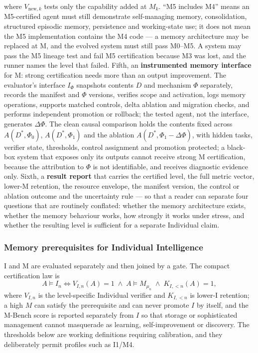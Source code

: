 where $V_{\mathrm{new},k}$ tests only the capability added at $M_k$. ``M5 includes M4'' means an M5-certified agent must still demonstrate self-managing memory, consolidation, structured episodic memory, persistence and working-state use; it does not mean the M5 implementation contains the M4 code --- a memory architecture may be replaced at M\Om{}, and the evolved system must still pass M0--M5. A system may pass the M5 lineage test and fail M5 certification because M3 was lost, and the runner names the level that failed. Fifth, an \textbf{instrumented memory interface} for M\Om{}: strong certification needs more than an output improvement. The evaluator's interface $I_\Phi$ snapshots contents $D$ and mechanism $\Phi$ separately, records the manifest and $\Phi$ versions, verifies scope and activation, logs memory operations, supports matched controls, delta ablation and migration checks, and performs independent promotion or rollback; the tested agent, not the interface, generates $\Delta\Phi$. The clean causal comparison holds the contents fixed across $A(D^{*},\Phi_0)$, $A(D^{*},\Phi_1)$ and the ablation $A(D^{*},\Phi_1 - \Delta\Phi)$, with hidden tasks, verifier state, thresholds, control assignment and promotion protected; a black-box system that exposes only its outputs cannot receive strong M\Om{} certification, because the attribution to $\Phi$ is not identifiable, and receives diagnostic evidence only. Sixth, a \textbf{result report} that carries the certified level, the full metric vector, lower-M retention, the resource envelope, the manifest version, the control or ablation outcome and the uncertainty rule --- so that a reader can separate four questions that are routinely conflated: whether the memory architecture exists, whether the memory behaviour works, how strongly it works under stress, and whether the resulting level is sufficient for a separate Individual claim.

\subsubsection{Memory prerequisites for Individual Intelligence}

I and M are evaluated separately and then joined by a gate. The compact certification law is
\begin{equation}
A \models I_n \iff V_{I,n}(A) = 1 \;\wedge\; A \models M_{\mu_n} \;\wedge\; K_{I,<n}(A) = 1,
\end{equation}
where $V_{I,n}$ is the level-specific Individual verifier and $K_{I,<n}$ is lower-I retention; a high $M$ can satisfy the prerequisite and can never promote $I$ by itself, and the M-Bench score is reported separately from $I$ so that storage or sophisticated management cannot masquerade as learning, self-improvement or discovery. The thresholds below are working definitions requiring calibration, and they deliberately permit profiles such as I1/M4.

